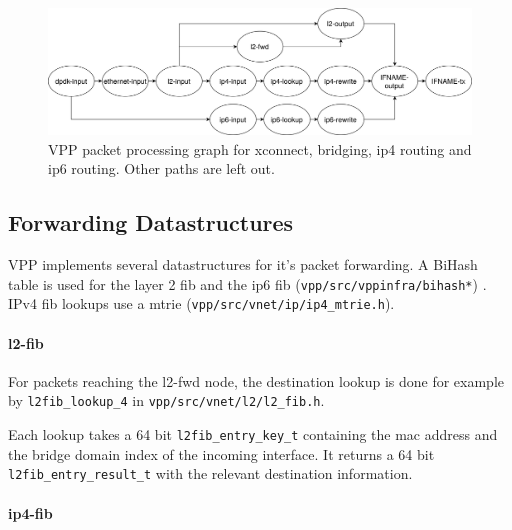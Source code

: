 \begin{figure}[!ht]
\noindent\hspace{0.5mm}\includegraphics[width=\linewidth]{pics/vpp-nodes-horizontal.png}
\caption{VPP packet processing graph for xconnect, bridging, ip4 routing and ip6 routing. Other paths are left out. }
\label{nodegraph}
\end{figure}

 
\subsection{Forwarding Datastructures}

VPP implements several datastructures for it's packet forwarding. A
BiHash table is used for the layer 2 \Ac{fib} and the ip6 \Ac{fib}
(\lstinline|vpp/src/vppinfra/bihash*|) \cite{vppwiki:bihash}. IPv4
\Ac{fib} lookups use a mtrie
(\lstinline|vpp/src/vnet/ip/ip4_mtrie.h|).



\paragraph{l2-fib}

For packets reaching the l2-fwd node, the destination lookup is done
for example by \lstinline|l2fib_lookup_4| in
\lstinline|vpp/src/vnet/l2/l2_fib.h|. 

Each lookup takes a 64 bit \lstinline|l2fib_entry_key_t| containing
the mac address and the bridge domain index of the incoming interface.
It returns a 64 bit \lstinline|l2fib_entry_result_t| with the relevant
destination information. 


\paragraph{ip4-fib}

